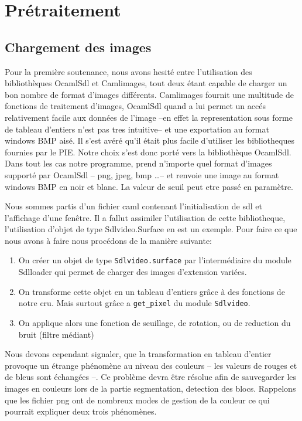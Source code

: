 \documentclass[]{report}
\begin{document}
	\chapter{Pr\'etraitement} %
	\label{cha:pr'etraitement}
        \section{Chargement des images} %
        Pour la première soutenance, nous avons hesité entre l'utilisation des bibliothèques OcamlSdl et Camlimages, tout deux étant
        capable de charger un bon nombre de format d'images différents. Camlimages fournit une multitude de fonctions de traitement
        d'images, OcamlSdl quand a lui permet un accés relativement facile aux données de l'image --en effet la representation sous
        forme de tableau d'entiers n'est pas tres intuitive-- et une exportation au format windows BMP aisé.
        Il s'est avéré qu'il était plus facile d'utiliser les bibliotheques fournies par le PIE. Notre choix s'est donc porté vers
        la bibliothèque OcamlSdl.
        Dans tout les cas notre programme, prend n'importe quel format d'images supporté par OcamlSdl -- png, jpeg, bmp \ldots--
        et renvoie une image au format windows BMP en noir et blanc. La valeur de seuil peut etre passé en paramètre.

        \label{sec:Ocamlsdl}
        Nous sommes partis d'un fichier caml contenant l'initialisation de sdl et l'affichage d'une fenêtre. Il a fallut assimiler
        l'utilisation de cette bibliotheque, l'utilisation d'objet de type Sdlvideo.Surface en est un exemple. Pour faire ce que
        nous avons à faire nous procédons de la manière suivante:
        \begin{enumerate}
          \item On créer un objet de type \verb!Sdlvideo.surface! par l'intermédiaire du module Sdlloader qui permet de charger des
            images d'extension variées.
          \item On transforme cette objet en un tableau d'entiers grâce à des fonctions de notre cru. Mais surtout grâce a \verb!get_pixel! du module \verb!Sdlvideo!.
          \item On applique alors une fonction de seuillage, de rotation, ou de reduction du bruit (filtre médiant)
        \end{enumerate}

        Nous devons cependant signaler, que la transformation en tableau d'entier provoque un étrange phénomène au niveau des
        couleurs -- les valeurs de rouges et de bleus sont échangées --. Ce problème devra être résolue afin de sauvegarder
        les images en couleurs lors de la partie segmentation, detection des blocs. Rappelons que les fichier png ont de
        nombreux modes de gestion de la couleur ce qui pourrait expliquer deux trois phénomènes.
\end{document}
